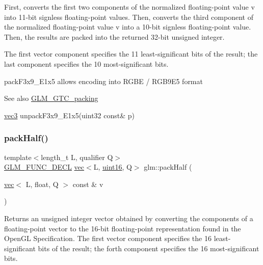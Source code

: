 First, converts the first two components of the normalized floating-\/point value v into 11-\/bit signless floating-\/point values. Then, converts the third component of the normalized floating-\/point value v into a 10-\/bit signless floating-\/point value. Then, the results are packed into the returned 32-\/bit unsigned integer.

The first vector component specifies the 11 least-\/significant bits of the result; the last component specifies the 10 most-\/significant bits.

pack\+F3x9\+\_\+\+E1x5 allows encoding into R\+G\+BE / R\+G\+B9\+E5 format

\begin{DoxySeeAlso}{See also}
\mbox{\hyperlink{group__gtc__packing}{G\+L\+M\+\_\+\+G\+T\+C\+\_\+packing}} 

\mbox{\hyperlink{group__core__types_ga1c47e8b3386109bc992b6c48e91b0be7}{vec3}} unpack\+F3x9\+\_\+\+E1x5(uint32 const\& p) 
\end{DoxySeeAlso}
\mbox{\label{group__gtc__packing_ga2d8bbce673ebc04831c1fb05c47f5251}} 
\subsubsection{\texorpdfstring{pack\+Half()}{packHalf()}}
{\footnotesize\ttfamily template$<$length\+\_\+t L, qualifier Q$>$ \\
\mbox{\hyperlink{setup_8hpp_ab2d052de21a70539923e9bcbf6e83a51}{G\+L\+M\+\_\+\+F\+U\+N\+C\+\_\+\+D\+E\+CL}} \mbox{\hyperlink{structglm_1_1vec}{vec}}$<$L, \mbox{\hyperlink{group__gtc__type__precision_gad8c2939e1fdd8e5828b31d95c52255d5}{uint16}}, Q$>$ glm\+::pack\+Half (\begin{DoxyParamCaption}\item[{\mbox{\hyperlink{structglm_1_1vec}{vec}}$<$ L, float, Q $>$ const \&}]{v }\end{DoxyParamCaption})}

Returns an unsigned integer vector obtained by converting the components of a floating-\/point vector to the 16-\/bit floating-\/point representation found in the Open\+GL Specification. The first vector component specifies the 16 least-\/significant bits of the result; the forth component specifies the 16 most-\/significant bits.

